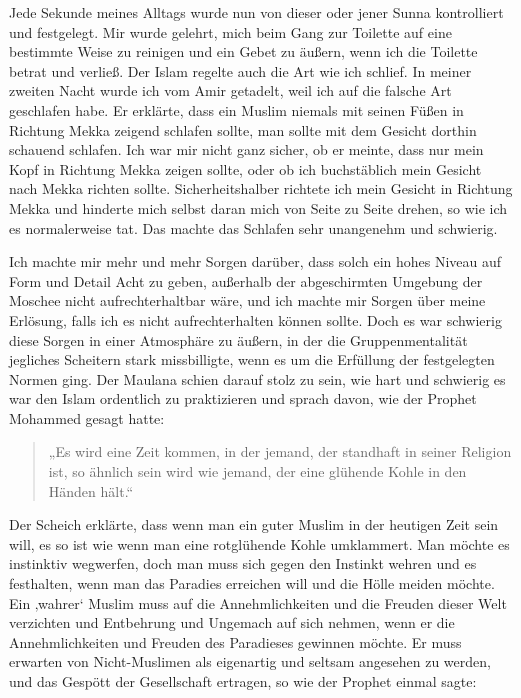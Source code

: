 \documentclass[12pt]{memoir}
\begin{document}
Jede Sekunde meines Alltags wurde nun von dieser
oder jener Sunna kontrolliert und festgelegt.
Mir wurde gelehrt, mich beim Gang zur Toilette
auf eine bestimmte Weise zu reinigen und ein Gebet zu äußern,
wenn ich die Toilette betrat und verließ.
Der Islam regelte auch die Art wie ich schlief.
In meiner zweiten Nacht wurde ich vom Amir getadelt,
weil ich auf die falsche Art geschlafen habe.
Er erklärte, dass ein Muslim niemals mit seinen Füßen
in Richtung Mekka zeigend schlafen sollte,
man sollte mit dem Gesicht dorthin schauend schlafen.
Ich war mir nicht ganz sicher, ob er meinte,
dass nur mein Kopf in Richtung Mekka zeigen sollte,
oder ob ich buchstäblich mein Gesicht nach Mekka richten sollte.
Sicherheitshalber richtete ich mein Gesicht in Richtung Mekka
und hinderte mich selbst daran mich von Seite zu Seite drehen,
so wie ich es normalerweise tat.
Das machte das Schlafen sehr unangenehm und schwierig.

Ich machte mir mehr und mehr Sorgen darüber,
dass solch ein hohes Niveau auf Form und Detail Acht zu geben,
außerhalb der abgeschirmten Umgebung der Moschee nicht aufrechterhaltbar wäre,
und ich machte mir Sorgen über meine Erlösung,
falls ich es nicht aufrechterhalten können sollte.
Doch es war schwierig diese Sorgen in einer Atmosphäre zu äußern,
in der die Gruppenmentalität jegliches Scheitern stark missbilligte,
wenn es um die Erfüllung der festgelegten Normen ging.
Der Maulana schien darauf stolz zu sein,
wie hart und schwierig es war den Islam ordentlich zu praktizieren
und sprach davon, wie der Prophet Mohammed gesagt hatte:

\begin{quote}
„Es wird eine Zeit kommen, in der jemand,
der standhaft in seiner Religion ist, so ähnlich sein wird wie jemand,
der eine glühende Kohle in den Händen hält.“
\end{quote}

Der Scheich erklärte, dass wenn man ein guter Muslim
in der heutigen Zeit sein will,
es so ist wie wenn man eine rotglühende Kohle umklammert.
Man möchte es instinktiv wegwerfen,
doch man muss sich gegen den Instinkt wehren und es festhalten,
wenn man das Paradies erreichen will und die Hölle meiden möchte.
Ein ‚wahrer‘ Muslim muss auf die Annehmlichkeiten
und die Freuden dieser Welt verzichten und Entbehrung
und Ungemach auf sich nehmen,
wenn er die Annehmlichkeiten und Freuden des Paradieses gewinnen möchte.
Er muss erwarten von Nicht-Muslimen als eigenartig
und seltsam angesehen zu werden, und das Gespött der Gesellschaft ertragen,
so wie der Prophet einmal sagte:
\end{document}
